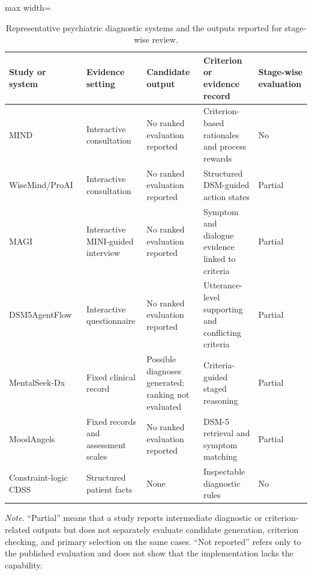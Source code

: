 \begin{table}[htbp]
\centering
\caption{Representative psychiatric diagnostic systems and the outputs reported for stage-wise review.}
\label{tab:related-work-matrix}
\small
\begin{adjustbox}{max width=\textwidth}
\begin{tabular}{|>{\raggedright\arraybackslash}p{2.5cm}|>{\raggedright\arraybackslash}p{2.7cm}|>{\raggedright\arraybackslash}p{3.1cm}|>{\raggedright\arraybackslash}p{4.3cm}|>{\centering\arraybackslash}p{2.0cm}|}
\hline
Study or system & Evidence setting & Candidate output & Criterion or evidence record & Stage-wise evaluation\\
\hline
MIND~\citep{li2026mind} & Interactive consultation & No ranked evaluation reported & Criterion-based rationales and process rewards & No\\
\hline
WiseMind/\allowbreak ProAI~\citep{wu2026wisemind} & Interactive consultation & No ranked evaluation reported & Structured DSM-guided action states & Partial\\
\hline
MAGI~\citep{bi2025magi} & Interactive MINI-guided interview & No ranked evaluation reported & Symptom and dialogue evidence linked to criteria & Partial\\
\hline
DSM5Agent\allowbreak Flow~\citep{ozgun2025dsm5agentflow} & Interactive questionnaire & No ranked evaluation reported & Utterance-level supporting and conflicting criteria & Partial\\
\hline
MentalSeek-Dx~\citep{sun2026mentalseek} & Fixed clinical record & Possible diagnoses generated; ranking not evaluated & Criteria-guided staged reasoning & Partial\\
\hline
Mood\allowbreak Angels~\citep{xiao2025moodangels} & Fixed records and assessment scales & No ranked evaluation reported & DSM-5 retrieval and symptom matching & Partial\\
\hline
Constraint-logic CDSS~\citep{kim2025clp} & Structured patient facts & None & Inspectable diagnostic rules & No\\
\hline
\end{tabular}
\end{adjustbox}

\vspace{0.4em}
\begin{minipage}{0.98\textwidth}
\footnotesize
\textit{Note.} ``Partial'' means that a study reports intermediate diagnostic or criterion-related outputs but does not separately evaluate candidate generation, criterion checking, and primary selection on the same cases. ``Not reported'' refers only to the published evaluation and does not show that the implementation lacks the capability.
\end{minipage}
\end{table}
\FloatBarrier

